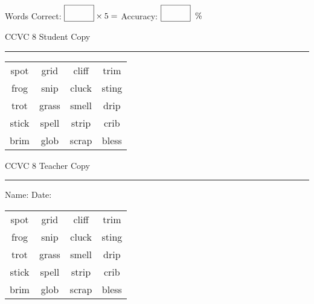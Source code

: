 \documentclass{memoir}
\begin{document}
\normalsize

Words Correct: $\fbox{\phantom{\huge 100}} \times 5 = $ Accuracy: $\fbox{\phantom{\huge 100}}\;\; \%$ 

\vfill

\newpage


\footnotesize \noindent
CCVC 8 \hfill Student Copy
\smallskip
\hrule

\Large

\setlength{\tabcolsep}{14pt}
\def\arraystretch{3}

{\selectfont


\begin{vplace}[0.5]
\begin{center}
\begin{tabular}{cccc}
spot & grid & cliff            & trim \\
frog & snip & cluck & sting \\
trot & grass                    & smell & drip \\
stick & spell & strip & crib \\
brim      & glob & scrap & bless \\
\end{tabular}
\end{center}
\end{vplace}

}

\newpage

\footnotesize \noindent
CCVC 8 \hfill Teacher Copy
\smallskip
\hrule

\normalsize

\vfill

\noindent
Name: \underline{\hspace{1.75in}} \hfill Date: \underline{\hspace{1in}}

\Large

{\selectfont


\begin{vplace}[0.5]
\begin{center}
\begin{tabular}{cccc}
spot & grid & cliff            & trim \\
frog & snip & cluck & sting \\
trot & grass                    & smell & drip \\
stick & spell & strip & crib \\
brim      & glob & scrap & bless \\
\end{tabular}
\end{center}
\end{vplace}



}
\end{document}
